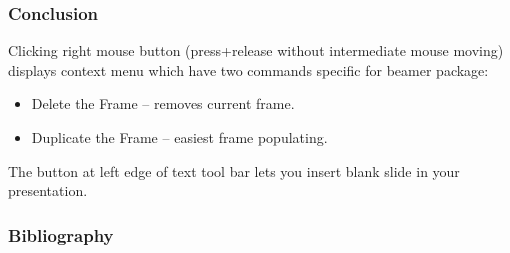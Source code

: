 \documentclass{beamer}
\begin{document}
\begin{frame}
  \frametitle{Conclusion}

  Clicking right mouse button 
  (press+release without intermediate mouse moving) 
  displays context menu
  which have two commands specific for beamer package: 

  \begin{itemize}
  \item
     \alert{Delete the Frame} -- removes current frame.
  \item
     \alert{Duplicate the Frame} -- easiest frame populating.
  \end{itemize}

  The button 
  at left edge of text 
  tool bar lets you insert blank slide in your presentation.

\end{frame}


\begin{frame}[allowframebreaks]
\frametitle{Bibliography}
\printbibliography
\end{frame}
\end{document}
